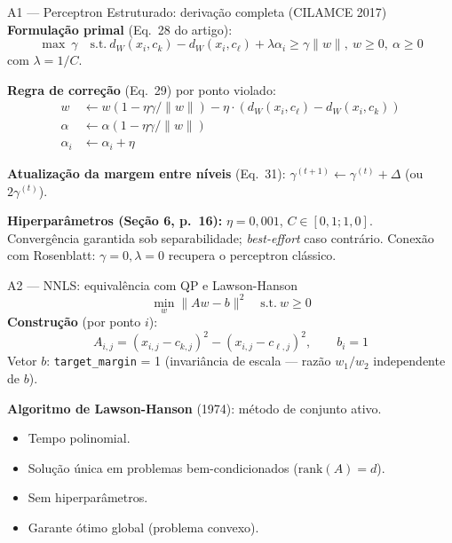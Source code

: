 \documentclass[aspectratio=169,10pt]{beamer}
\begin{document}
\begin{frame}{A1 --- Perceptron Estruturado: deriva\c{c}\~ao completa (CILAMCE 2017)}
  \scriptsize
  \textbf{Formula\c{c}\~ao primal} (Eq.\ 28 do artigo):
  \[ \max\ \gamma \quad \text{s.t.}\ d_W(x_i,c_k) - d_W(x_i,c_\ell) + \lambda\alpha_i \geq \gamma\|w\|,\ w \geq 0,\ \alpha \geq 0 \]
  com $\lambda = 1/C$.
  \medskip

  \textbf{Regra de corre\c{c}\~ao} (Eq.\ 29) por ponto violado:
  \begin{align*}
    w &\leftarrow w(1 - \eta\gamma/\|w\|) - \eta\cdot(d_W(x_i,c_\ell) - d_W(x_i,c_k)) \\
    \alpha &\leftarrow \alpha(1 - \eta\gamma/\|w\|) \\
    \alpha_i &\leftarrow \alpha_i + \eta
  \end{align*}

  \textbf{Atualiza\c{c}\~ao da margem entre n\'iveis} (Eq.\ 31): $\gamma^{(t+1)} \leftarrow \gamma^{(t)} + \Delta$ (ou $2\gamma^{(t)}$).
  \medskip

  \textbf{Hiperpar\^ametros (Se\c{c}\~ao 6, p.\ 16):} $\eta = 0{,}001$, $C \in [0{,}1; 1{,}0]$.\\
  Converg\^encia garantida sob separabilidade; \emph{best-effort} caso contr\'ario. Conex\~ao com Rosenblatt: $\gamma = 0, \lambda = 0$ recupera o perceptron cl\'assico.
\end{frame}

\begin{frame}{A2 --- NNLS: equival\^encia com QP e Lawson-Hanson}
  \scriptsize
  \[ \min_w \|Aw - b\|^2 \quad \text{s.t.}\ w \geq 0 \]
  \textbf{Constru\c{c}\~ao} (por ponto $i$):
  \[ A_{i,j} = (x_{i,j} - c_{k,j})^2 - (x_{i,j} - c_{\ell,j})^2, \qquad b_i = 1 \]
  Vetor $b$: \texttt{target\_margin} = 1 (invari\^ancia de escala --- raz\~ao $w_1/w_2$ independente de $b$).
  \medskip

  \textbf{Algoritmo de Lawson-Hanson} (1974): m\'etodo de conjunto ativo.
  \begin{itemize}
    \item Tempo polinomial.
    \item Solu\c{c}\~ao \'unica em problemas bem-condicionados ($\text{rank}(A) = d$).
    \item Sem hiperpar\^ametros.
    \item Garante \'otimo global (problema convexo).
  \end{itemize}
\end{frame}
\end{document}

